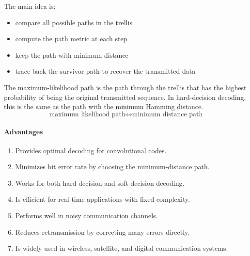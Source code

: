 \documentclass[11pt,a4paper]{book}
\newenvironment{infobox}[1][Information]{%
    \begin{tcolorbox}[
        enhanced,
        breakable,
        colback=mintgreen!10,
        colframe=mintgreen!200,
        title=#1,
        fonttitle=\bfseries,
        sharp corners,
        boxrule=0.8pt,
        left=8pt,
        right=8pt,
        top=6pt,
        bottom=6pt
    ]
}{\end{tcolorbox}}
\begin{document}
The main idea is:
\begin{itemize}
    \item compare all possible paths in the trellis
    \item compute the path metric at each step
    \item keep the path with minimum distance
    \item trace back the survivor path to recover the transmitted data
\end{itemize}

\begin{infobox}[Maximum Likelihood Path]
The maximum-likelihood path is the path through the trellis that has the highest probability of being the original transmitted sequence. In hard-decision decoding, this is the same as the path with the minimum Hamming distance.
\[
\text{maximum likelihood path} \Longleftrightarrow \text{minimum distance path}
\]
\end{infobox}

\paragraph{Advantages}
\begin{enumerate}
    \item Provides optimal decoding for convolutional codes.
    \item Minimizes bit error rate by choosing the minimum-distance path.
    \item Works for both hard-decision and soft-decision decoding.
    \item Is efficient for real-time applications with fixed complexity.
    \item Performs well in noisy communication channels.
    \item Reduces retransmission by correcting many errors directly.
    \item Is widely used in wireless, satellite, and digital communication systems.
\end{enumerate}
\end{document}
